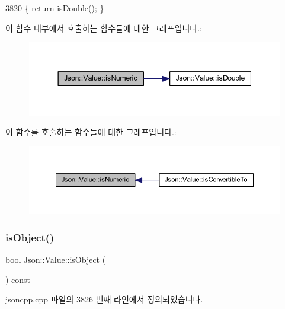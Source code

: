 \begin{DoxyCode}
3820 \{ \textcolor{keywordflow}{return} \hyperlink{class_json_1_1_value_a4a2e2a790e19a1c09fc5dd12d7ad47b5}{isDouble}(); \}
\end{DoxyCode}
이 함수 내부에서 호출하는 함수들에 대한 그래프입니다.\+:\nopagebreak
\begin{figure}[H]
\begin{center}
\leavevmode
\includegraphics[width=344pt]{class_json_1_1_value_af961a000cd203c895e44c195ab39b866_cgraph}
\end{center}
\end{figure}
이 함수를 호출하는 함수들에 대한 그래프입니다.\+:\nopagebreak
\begin{figure}[H]
\begin{center}
\leavevmode
\includegraphics[width=350pt]{class_json_1_1_value_af961a000cd203c895e44c195ab39b866_icgraph}
\end{center}
\end{figure}
\mbox{\label{class_json_1_1_value_a8cf96c0f2a552051fcfc78ffee60e037}} 
\subsubsection{\texorpdfstring{is\+Object()}{isObject()}}
{\footnotesize\ttfamily bool Json\+::\+Value\+::is\+Object (\begin{DoxyParamCaption}{ }\end{DoxyParamCaption}) const}



jsoncpp.\+cpp 파일의 3826 번째 라인에서 정의되었습니다.


